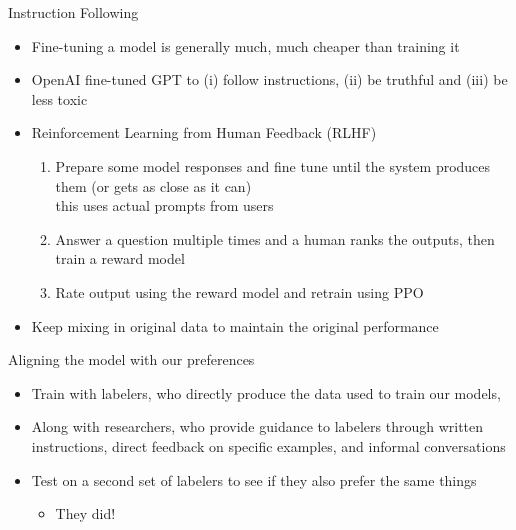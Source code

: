 \documentclass{beamer}
\begin{document}
\begin{frame}{Instruction Following}

\begin{itemize}
\item Fine-tuning a model is generally much, much cheaper than training it
\item OpenAI fine-tuned GPT to (i) follow instructions, (ii) be truthful and (iii) be less toxic
\item  Reinforcement Learning from  Human Feedback (RLHF)
  \begin{enumerate}
  \item Prepare some model responses and fine tune until the system
    produces them (or gets as close as it can)
    \\ this uses actual prompts from users
  \item Answer a question multiple times and a human ranks the
    outputs, then train a reward model 
  \item Rate output using the reward model and retrain using PPO
  \end{enumerate}
\item  Keep mixing in original data to maintain the original performance
    
\end{itemize}

\end{frame}

\begin{frame}{Aligning the model with our preferences}
\begin{itemize}
\item Train with labelers, who directly produce the data used to train our models,
\item Along with  researchers, who provide guidance to labelers through written instructions, direct feedback on specific examples, and informal conversations
\item Test on a second set of labelers to see if they also prefer the same things
  \begin{itemize}
  \item They did!
  \end{itemize}

\end{itemize}

\end{frame}
\end{document}
